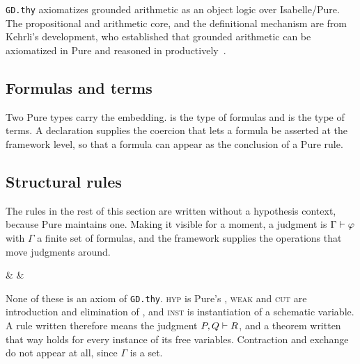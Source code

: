 \section{\QGA}
\label{sec:qga}

\texttt{GD.thy} axiomatizes grounded arithmetic as an object logic over
Isabelle/Pure.  The propositional and arithmetic core, and the definitional
mechanism are from Kehrli's development, who established
that grounded arithmetic can be axiomatized in Pure and reasoned in
productively~\cite{kehrli}.

\subsection{Formulas and terms}

Two Pure types carry the embedding.   is the type of \QGA{} formulas and
 is the type of \QGA{} terms.  A  declaration supplies
the coercion  that lets a formula be asserted at the
framework level, so that a \QGA{} formula can appear as the conclusion of a
Pure rule.

\subsection{Structural rules}
\label{sec:structural}

The rules in the rest of this section are written without a hypothesis context,
because Pure maintains one.  Making it visible for a moment, a \QGA{} judgment is
$\Gamma \vdash \varphi$ with $\Gamma$ a finite set of formulas, and the framework
supplies the operations that move judgments around.

\begin{rulesiii}
 &
 &
\\[3.2ex]
\end{rulesiii}

\noindent
None of these is an axiom of \texttt{GD.thy}.  \textsc{hyp} is Pure's
, \textsc{weak} and \textsc{cut} are introduction and elimination of
, and \textsc{inst} is instantiation of a schematic variable.  A rule
written  therefore means the judgment $P, Q \vdash R$, and a
theorem written that way holds for every instance of its free variables.
Contraction and exchange do not appear at all, since $\Gamma$ is a set.

